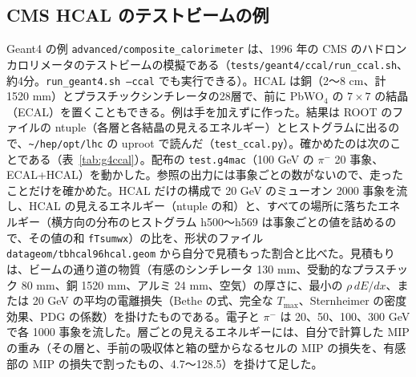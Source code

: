 \documentclass[a4paper,10pt]{ltjsarticle}
\newcommand{\pth}[1]{\texttt{\textasciitilde/}\nolinkurl{#1}}
\begin{document}
\subsection{CMS HCAL のテストビームの例}\label{sec:geant4ccal}

Geant4 の例 \texttt{advanced/composite\_calorimeter} は、1996 年の CMS のハドロンカロリメータのテストビームの模擬である（\nolinkurl{tests/geant4/ccal/run_ccal.sh}、約4分。\texttt{run\_geant4.sh --ccal} でも実行できる）。HCAL は銅（2〜8 cm、計 1520 mm）とプラスチックシンチレータの28層で、前に PbWO$_4$ の $7\times7$ の結晶（ECAL）を置くこともできる。例は手を加えずに作った。結果は ROOT のファイルの ntuple（各層と各結晶の見えるエネルギー）とヒストグラムに出るので、\pth{hep/opt/lhc} の uproot で読んだ（\texttt{test\_ccal.py}）。確かめたのは次のことである（表~\ref{tab:g4ccal}）。配布の \texttt{test.g4mac}（100 GeV の $\pi^-$ 20 事象、ECAL+HCAL）を動かした。参照の出力には事象ごとの数がないので、走ったことだけを確かめた。HCAL だけの構成で 20 GeV のミューオン 2000 事象を流し、HCAL の見えるエネルギー（ntuple の和）と、すべての場所に落ちたエネルギー（横方向の分布のヒストグラム h500〜h569 は事象ごとの値を詰めるので、その値の和 \texttt{fTsumwx}）の比を、形状のファイル \nolinkurl{datageom/tbhcal96hcal.geom} から自分で見積もった割合と比べた。見積もりは、ビームの通り道の物質（有感のシンチレータ 130 mm、受動的なプラスチック 80 mm、銅 1520 mm、アルミ 24 mm、空気）の厚さに、最小の $\rho\,dE/dx$、または 20 GeV の平均の電離損失（Bethe の式、完全な $T_{\max}$、Sternheimer の密度効果、PDG の係数）を掛けたものである。電子と $\pi^-$ は 20、50、100、300 GeV で各 1000 事象を流した。層ごとの見えるエネルギーには、自分で計算した MIP の重み（その層と、手前の吸収体と箱の壁からなるセルの MIP の損失を、有感部の MIP の損失で割ったもの、4.7〜128.5）を掛けて足した。
\end{document}
